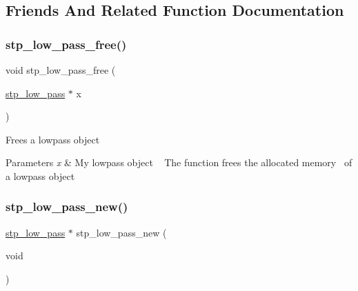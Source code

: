 \subsection{Friends And Related Function Documentation}
\mbox{\label{structstp__low__pass_a8fde5eb059affdd98ed624f4cb82c06c}} 
\subsubsection{\texorpdfstring{stp\+\_\+low\+\_\+pass\+\_\+free()}{stp\_low\_pass\_free()}}
{\footnotesize\ttfamily void stp\+\_\+low\+\_\+pass\+\_\+free (\begin{DoxyParamCaption}\item[{\hyperlink{structstp__low__pass}{stp\+\_\+low\+\_\+pass} $\ast$}]{x }\end{DoxyParamCaption})\hspace{0.3cm}{\ttfamily [related]}}



Frees a lowpass object~\newline
 


\begin{DoxyParams}{Parameters}
{\em x} & My lowpass object ~\newline
 The function frees the allocated memory~\newline
 of a lowpass object \\
\hline
\end{DoxyParams}
\mbox{\label{structstp__low__pass_a445025e9f901399ddb2313b5d667560c}} 
\subsubsection{\texorpdfstring{stp\+\_\+low\+\_\+pass\+\_\+new()}{stp\_low\_pass\_new()}}
{\footnotesize\ttfamily \hyperlink{structstp__low__pass}{stp\+\_\+low\+\_\+pass} $\ast$ stp\+\_\+low\+\_\+pass\+\_\+new (\begin{DoxyParamCaption}\item[{void}]{ }\end{DoxyParamCaption})\hspace{0.3cm}{\ttfamily [related]}}



